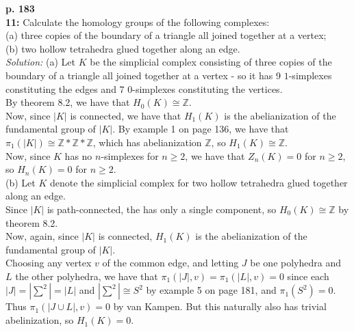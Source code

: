 \documentclass[a4paper]{article}
\begin{document}
    \textbf{p. 183}\\
    \textbf{11:} Calculate the homology groups of the following complexes:\\
    (a) three copies of the boundary of a triangle all joined together at
    a vertex;\\
    (b) two hollow tetrahedra glued together along an edge.\\
    \linebreak
    \textit{Solution:}
    (a) Let $K$ be the simplicial complex consisting of
    three copies of the boundary of a triangle all joined together at a vertex
    - so it has 9 $1$-simplexes constituting the edges and
    7 $0$-simplexes constituting the vertices.\\
    By theorem 8.2, we have that
    $H_0 (K) \cong \mathbb{Z}$.\\
    Now, since $\left| K \right| $ is connected, we have that
    $H_1 (K)$ is the abelianization of the fundamental group of
    $\left| K \right| $. By example 1 on page 136, we have that
    $\pi_1 (\left| K \right| ) \cong \mathbb{Z} * \mathbb{Z} * \mathbb{Z}$,
    which has abelianization $\mathbb{Z}$, so
    $H_1 (K) \cong \mathbb{Z}$.\\
    Now, since $K$ has no $n$-simplexes for $n \ge 2$, we have
    that $Z_n (K) = 0$ for $n \ge 2$, so
    $H_n (K) = 0$ for $n\ge 2$.\\
    \linebreak
    (b) Let $K$ denote the simplicial complex for two hollow tetrahedra glued
    together along an edge.\\
    Since  $\left| K \right| $ is path-connected, the has only a single
    component, so $H_0(K) \cong \mathbb{Z}$ by theorem 8.2.\\
    Now, again, since $\left| K \right| $ is connected, $H_1(K)$ is the
    abelianization of the fundamental group of
    $\left| K \right| $.\\
    Choosing any vertex $v$ of the common edge, and letting
    $J$ be one polyhedra and $L$ the other polyhedra, we have
    that $\pi_1 \left( \left| J \right| ,v \right) 
    = \pi_1 \left( \left| L \right| ,v \right) 
    = 0$ since each
    $\left| J \right| = \left| \sum^{2} \right| = \left| L \right|  $ and
    $\left| \sum^{2} \right| \cong S^{2}$ by example 5 on page 181, and
    $\pi_1 \left( S^{2} \right) = 0$. Thus
    $\pi_1 \left( \left| J \cup L \right| ,v \right) 
    = 0$ by van Kampen. But this naturally also has trivial abelinization, so
    $H_1 \left( K \right) = 0$.\\
\end{document}
